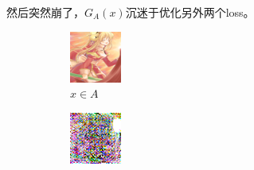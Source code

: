 \documentclass{beamer}
\begin{document}
\begin{frame}
然后突然崩了，$G_A(x)$沉迷于优化另外两个loss。
\begin{figure}[htb]
    \centering
    \begin{subfigure}[b]{0.23\linewidth}
        \includegraphics[width=\linewidth]{exp2_epoch100_real_A.png}
        \caption{$x \in A$}
      \end{subfigure}
      \begin{subfigure}[b]{0.23\linewidth}
        \includegraphics[width=\linewidth]{exp2_epoch100_fake_B.png}

\end{subfigure}
\end{figure}
\end{frame}
\end{document}
